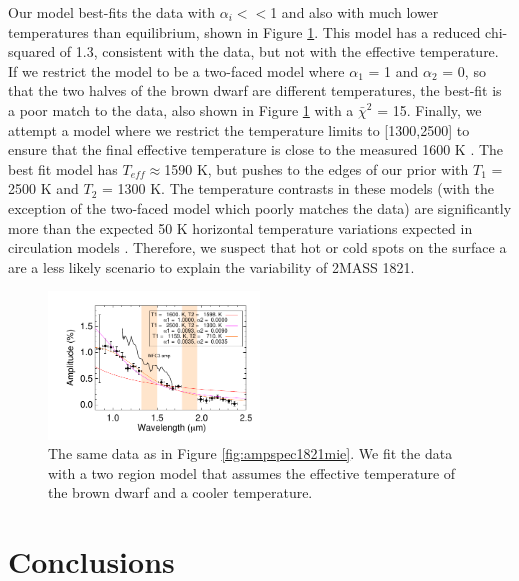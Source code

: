 \documentclass[twocolumn]{aastex6}
\begin{document}
Our model best-fits the data with $\alpha_i << $1 and also with much lower temperatures than equilibrium, shown in Figure \ref{fig:ampspec1821tdiff}.
This model has a reduced chi-squared of 1.3, consistent with the data, but not with the effective temperature.
If we restrict the model to be a two-faced model where $\alpha_1$ = 1 and $\alpha_2$ = 0, so that the two halves of the brown dwarf are different temperatures, the best-fit is a poor match to the data, also shown in Figure \ref{fig:ampspec1821tdiff} with a $\bar{\chi}^2$ = 15.
Finally, we attempt a model where we restrict the temperature limits to [1300,2500] to ensure that the final effective temperature is close to the measured 1600 K \citep{gagne2015banyan7}.
The best fit model has $T_{eff} \approx $1590 K, but pushes to the edges of our prior with $T_1$ = 2500 K and $T_2$ = 1300 K.
The temperature contrasts in these models (with the exception of the two-faced model which poorly matches the data) are significantly more than the expected 50 K horizontal temperature variations expected in circulation models \citep{showman2013bdgpDynamics}.
Therefore, we suspect that hot or cold spots on the surface a are a less likely scenario to explain the variability of 2MASS 1821.

\begin{figure}
\begin{centering}
\includegraphics[width=0.5\textwidth]{amp_vs_wavl_j1821_t_diff.pdf}
\caption{The same data as in Figure \ref{fig:ampspec1821mie}. We fit the data with a two region model that assumes the effective temperature of the brown dwarf and a cooler temperature.}\label{fig:ampspec1821tdiff}
\end{centering}
\end{figure}





\section{Conclusions}
\end{document}
